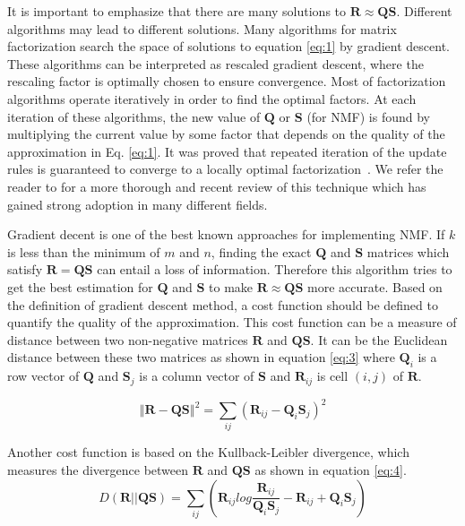 It is important to emphasize that there are many solutions to $\mathbf{R}\approx\mathbf{Q}\mathbf{S}$. Different algorithms may lead to different solutions. Many algorithms for matrix factorization search the space of solutions to equation \eqref{eq:1} by gradient descent. These algorithms can be interpreted as rescaled gradient descent, where the rescaling factor is optimally chosen to ensure convergence. Most of factorization algorithms operate iteratively in order to find the optimal factors. At each iteration of these algorithms, the new value of $\mathbf{Q}$ or $\mathbf{S}$ (for \ac{NMF}) is found by multiplying the current value by some factor that depends on the quality of the approximation in Eq. \eqref{eq:1}. It was proved that repeated iteration of the update rules is guaranteed to converge to a locally optimal factorization~\citep{seung2001algorithms}. We refer the reader to \citep{Berry2007} for a more thorough and recent review of this technique which has gained strong adoption in many different fields. 

Gradient decent is one of the best known approaches for implementing  \ac{NMF}.  If $k$ is less than the minimum of $m$ and $n$, finding the exact $\mathbf{Q}$ and $\mathbf{S}$ matrices which satisfy $\mathbf{R}=\mathbf{Q}\mathbf{S}$ can entail a loss of information. Therefore this algorithm tries to get the best estimation for $\mathbf{Q}$ and $\mathbf{S}$ to make $\mathbf{R}\approx\mathbf{Q}\mathbf{S}$ more accurate. Based on the definition of gradient descent method, a cost function should be defined to quantify the quality of the approximation. This cost function can be a measure of distance between two non-negative matrices $\mathbf{R}$ and $\mathbf{Q}\mathbf{S}$. It  can be the Euclidean distance between these two matrices as shown in equation \eqref{eq:3} where $\mathbf{Q}_{i}$ is a row vector of $\mathbf{Q}$ and $\mathbf{S}_{j}$ is a column vector of $\mathbf{S}$ and $\mathbf{R}_{ij}$ is cell $(i,j)$ of $\mathbf{R}$.

\begin{equation}
\left\Vert \mathbf{R}-\mathbf{Q}\mathbf{S}\right\Vert ^{2}=\sum_{{\scriptscriptstyle ij}}(\mathbf{R}_{ij}-\mathbf{Q}_{i}\mathbf{S}_{j})^2\label{eq:3}
\end{equation}


  
Another cost function  is based on the Kullback-Leibler divergence, which measures the divergence between $\mathbf{R}$ and $\mathbf{Q}\mathbf{S}$ as shown in equation \eqref{eq:4}. 
\begin{equation}
D(\mathbf{R}||\mathbf{Q}\mathbf{S})=\sum_{{\scriptscriptstyle ij}}(\mathbf{R}_{ij}log\frac{\mathbf{R}_{ij}}{\mathbf{Q}_{i}\mathbf{S}_{j}}-\mathbf{R}_{ij}+\mathbf{Q}_{i}\mathbf{S}_{j})\label{eq:4}
\end{equation}

